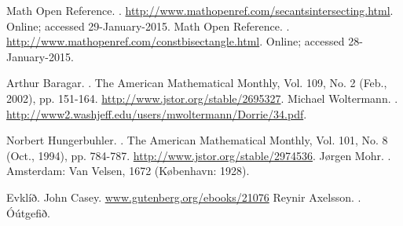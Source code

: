 \begin{frame}[allowframebreaks]
\begin{thebibliography}{10}
     Math Open Reference.
     .
     \newblock \url{http://www.mathopenref.com/secantsintersecting.html}.
     \newblock Online; accessed 29-January-2015.
     Math Open Reference.
     .
     \newblock \url{http://www.mathopenref.com/constbisectangle.html}.
     \newblock Online; accessed 28-January-2015.
     
  \beamertemplatearticlebibitems
     Arthur Baragar.
     .
      \newblock The American Mathematical Monthly, Vol. 109, No. 2 (Feb., 2002), pp. 151-164.
      \newblock  \url{http://www.jstor.org/stable/2695327}.
      Michael Woltermann.
      .
      \newblock  \url{http://www2.washjeff.edu/users/mwoltermann/Dorrie/34.pdf}.
      
      Norbert Hungerbuhler.
      .
      \newblock The American Mathematical Monthly, Vol. 101, No. 8 (Oct., 1994), pp. 784-787.
      \newblock \url{http://www.jstor.org/stable/2974536}.
  \beamertemplatebookbibitems
{}
  Jørgen Mohr.
  .
  \newblock Amsterdam: Van Velsen, 1672 (København: 1928).
  
  Evklíð.
  \newblock John Casey.
  \newblock \url{www.gutenberg.org/ebooks/21076}
  Reynir Axelsson.
  .
  \newblock Óútgefið.
  \end{thebibliography}
\end{frame}


